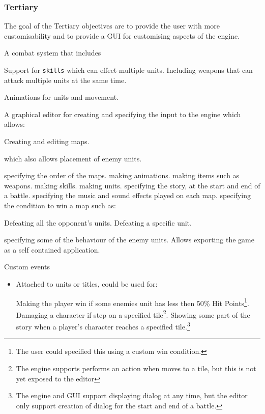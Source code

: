 \subsubsection{Tertiary} 
\label{tertiary}
The goal of the Tertiary objectives are to provide the user with more customisability and to provide a GUI for customising aspects of the engine. 

\begin{itemize}
	
	\tick A combat system that includes 
	\begin{itemize}
		\tick Support for \texttt{skills} which can effect multiple units.
		\tick Including weapons that can attack multiple units at the same time. 
	\end{itemize}
	
	\tick Animations for units and movement.
	
	\tick A graphical editor for  creating and specifying the input to the engine which allows:
	\begin{itemize}
		\tick   Creating and editing maps.
		\begin{itemize}
			\tick which also allows placement of enemy units.
		\end{itemize}
		
		\tick   specifying the order of the maps.
		\tick   making animations.
		\tick   making items such as weapons.
		\tick   making skills. 
		\tick   making units.
		\tick   specifying the story, at the start and end of a battle.
		\tick   specifying the music and sound effects played on each map.
		\tick   specifying the condition to win a map such as:
		 \begin{itemize}
		 	\tick Defeating all the opponent's units.
		 	\tick Defeating a specific unit.
		 \end{itemize}
		\tick   specifying some of the behaviour of the enemy units.
		\tick   Allows exporting the game as a self contained application.
	\end{itemize}
	
	\cross Custom events
	\begin{itemize}
		\item Attached to units or titles, could be used for:
		\begin{itemize}
			\partly Making the player win if some enemies unit has less then 50\% Hit Points\footnote{The user could specified this using a custom win condition.}.
			\partly Damaging a character if step on a specified tile\footnote{The engine supports performs an action when moves to a tile, but this is not yet exposed to the editor}.
			\partly Showing some part of the story when a player's character reaches a specified tile.\footnote{The engine and GUI support displaying dialog at any time, but the editor only support creation of dialog for the start and end of a battle.}
		\end{itemize}
	\end{itemize}
	
\end{itemize}